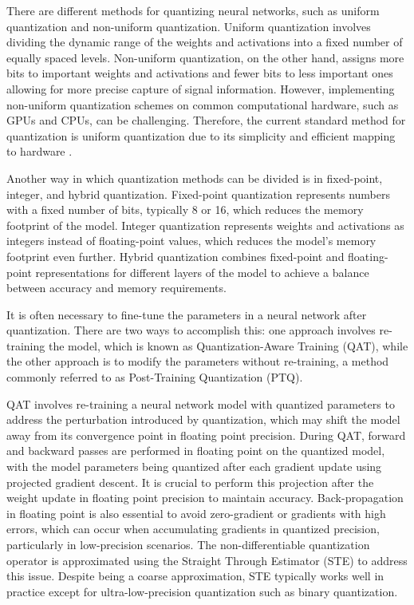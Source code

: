 There are different methods for quantizing neural networks, such as uniform quantization and non-uniform quantization. Uniform quantization involves dividing the dynamic range of the weights and activations into a fixed number of equally spaced levels. Non-uniform quantization, on the other hand, assigns more bits to important weights and activations and fewer bits to less important ones allowing for more precise capture of signal information. However, implementing non-uniform quantization schemes on common computational hardware, such as GPUs and CPUs, can be challenging. Therefore, the current standard method for quantization is uniform quantization due to its simplicity and efficient mapping to hardware \cite{gholami2021survey}.

Another way in which quantization methods can be divided is in fixed-point, integer, and hybrid quantization. Fixed-point quantization represents numbers with a fixed number of bits, typically 8 or 16, which reduces the memory footprint of the model. Integer quantization represents weights and activations as integers instead of floating-point values, which reduces the model's memory footprint even further. Hybrid quantization combines fixed-point and floating-point representations for different layers of the model to achieve a balance between accuracy and memory requirements.

It is often necessary to fine-tune the parameters in a neural network after quantization. There are two ways to accomplish this: one approach involves re-training the model, which is known as Quantization-Aware Training (QAT), while the other approach is to modify the parameters without re-training, a method commonly referred to as Post-Training Quantization (PTQ).

QAT involves re-training a neural network model with quantized parameters to address the perturbation introduced by quantization, which may shift the model away from its convergence point in floating point precision. During QAT, forward and backward passes are performed in floating point on the quantized model, with the model parameters being quantized after each gradient update using projected gradient descent. It is crucial to perform this projection after the weight update in floating point precision to maintain accuracy. Back-propagation in floating point is also essential to avoid zero-gradient or gradients with high errors, which can occur when accumulating gradients in quantized precision, particularly in low-precision scenarios. The non-differentiable quantization operator is approximated using the Straight Through Estimator (STE) to address this issue. Despite being a coarse approximation, STE typically works well in practice except for ultra-low-precision quantization such as binary quantization.

